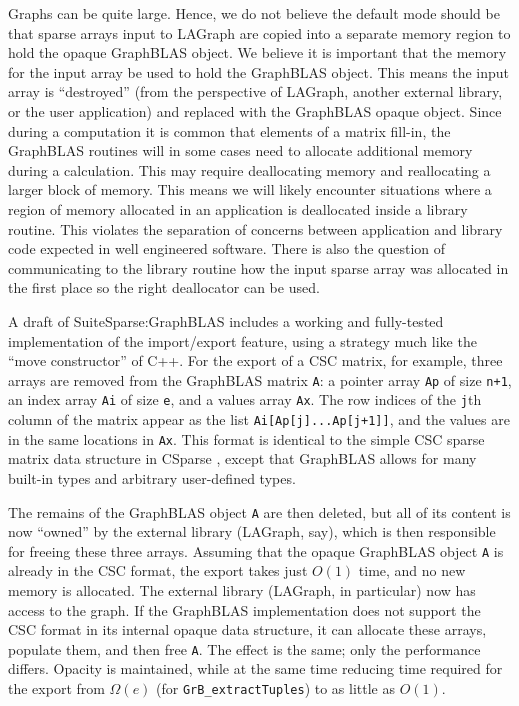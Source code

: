 Graphs can be quite large.   Hence, we do not believe the default mode should be that 
sparse arrays input to LAGraph are copied into a separate memory region to hold the 
opaque GraphBLAS object.  We believe it is important that the memory for the input array
be used to hold the GraphBLAS object. This means the input array is ``destroyed''
(from the perspective of LAGraph, another external library, or the user application) and replaced
with the GraphBLAS opaque object.  Since during a computation it is common that elements of a
matrix fill-in, the GraphBLAS routines will in some cases need to allocate additional memory during a 
calculation.  This may require deallocating memory and reallocating a larger block of memory.
This means we will likely encounter situations where a region of memory allocated in an application
is deallocated inside a library routine.  This violates the separation of concerns between application
and library code expected in well engineered software. There is also the question of communicating
to the library routine how the input sparse array was allocated in the first place so the right deallocator 
can be used.

A draft of SuiteSparse:GraphBLAS includes a working and fully-tested
implementation of the import/export feature, using a strategy much like the
``move constructor'' of C++.  For the export of a CSC matrix, for example,
three arrays are removed from the GraphBLAS matrix \verb'A': a pointer array
\verb'Ap' of size \verb'n+1', an index array \verb'Ai' of size \verb'e', and a
values array \verb'Ax'.  The row indices of the  \verb'j'th column of the
matrix appear as the list \verb'Ai[Ap[j]...Ap[j+1]]', and the values are in the
same locations in \verb'Ax'.  This format is identical to the simple CSC sparse
matrix data structure in CSparse \cite{Davis06book}, except that GraphBLAS
allows for many built-in types and arbitrary user-defined types.

The remains of the GraphBLAS object \verb'A' are then deleted, but all of its
content is now ``owned'' by the external library (LAGraph, say), which is then
responsible for freeing these three arrays.  Assuming that the opaque GraphBLAS
object \verb'A' is already in the CSC format, the export takes just $O(1)$
time, and no new memory is allocated.  The external library (LAGraph, in
particular) now has access to the graph.  If the GraphBLAS implementation does
not support the CSC format in its internal opaque data structure, it can
allocate these arrays, populate them, and then free \verb'A'.  The effect is
the same; only the performance differs.  Opacity is maintained, while at the
same time reducing time required for the export from $\Omega(e)$ (for
\verb'GrB_extractTuples') to as little as $O(1)$.

